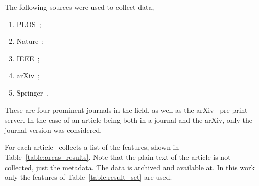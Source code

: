 \documentclass{article}
\theoremstyle{definition}
\begin{document}
The following sources were used to collect data,

\begin{enumerate}
        \item PLOS~\cite{plos_one};
        \item Nature~\cite{nature};
        \item IEEE~\cite{ieee};
        \item arXiv~\cite{mckiernan2000};
        \item Springer~\cite{springer}.
\end{enumerate}

These are four prominent journals in the field, as well as the arXiv~\cite{mckiernan2000}
pre print server. In the case of an article being both in a journal and the arXiv,
only the journal version was considered.

For each article~\cite{nikoleta_2017} collects a list of the features, shown in Table~\ref{table:arcas_results}.
Note that the plain text of the article is not collected, just the metadata. The
data is archived and available at. %
In this work only the features of Table~\ref{table:result_set} are used.

\begin{table}[!hbtp]
    \begin{center}
    \end{center}
    \caption{Metadata for each entry/article.}
    \label{table:arcas_results}
\end{table}
\end{document}
